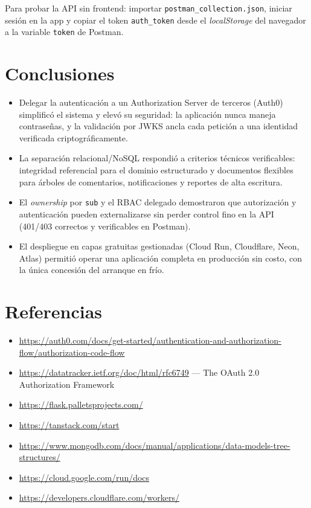 \documentclass{article}
\begin{document}
Para probar la API sin frontend: importar \texttt{postman\_collection.json},
iniciar sesión en la app y copiar el token \texttt{auth\_token} desde el
\textit{localStorage} del navegador a la variable \texttt{token} de Postman.

\section{Conclusiones}

\begin{itemize}[itemsep=2pt]
    \item Delegar la autenticación a un Authorization Server de terceros
    (Auth0) simplificó el sistema y elevó su seguridad: la aplicación nunca
    maneja contraseñas, y la validación por JWKS ancla cada petición a una
    identidad verificada criptográficamente.
    \item La separación relacional/NoSQL respondió a criterios técnicos
    verificables: integridad referencial para el dominio estructurado y
    documentos flexibles para árboles de comentarios, notificaciones y
    reportes de alta escritura.
    \item El \textit{ownership} por \texttt{sub} y el RBAC delegado
    demostraron que autorización y autenticación pueden externalizarse sin
    perder control fino en la API (401/403 correctos y verificables en Postman).
    \item El despliegue en capas gratuitas gestionadas (Cloud Run, Cloudflare,
    Neon, Atlas) permitió operar una aplicación completa en producción sin
    costo, con la única concesión del arranque en frío.
\end{itemize}

\clearpage
\section{Referencias}
\begin{itemize}
    \item \url{https://auth0.com/docs/get-started/authentication-and-authorization-flow/authorization-code-flow}
    \item \url{https://datatracker.ietf.org/doc/html/rfc6749} — The OAuth 2.0 Authorization Framework
    \item \url{https://flask.palletsprojects.com/}
    \item \url{https://tanstack.com/start}
    \item \url{https://www.mongodb.com/docs/manual/applications/data-models-tree-structures/}
    \item \url{https://cloud.google.com/run/docs}
    \item \url{https://developers.cloudflare.com/workers/}
\end{itemize}
\end{document}
